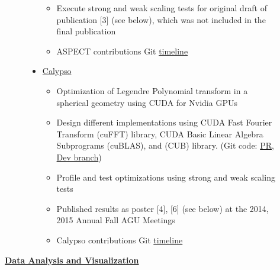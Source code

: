 \documentclass[11pt]{ltxdoc}
\begin{document}
\begin{description}
\begin{description}
\begin{itemize}
\begin{itemize}
            \item Execute strong and weak scaling tests for original draft of publication [3] (see below), which was not included in the final publication              
            
            \item ASPECT contributions Git \href{https://github.com/geodynamics/aspect/commits?author=hlokavarapu}{timeline}

           \end{itemize}

        \item       \href{https://geodynamics.org/cig/software/calypso/}{Calypso}         

          \begin{itemize}
          	
          	\item Optimization of Legendre Polynomial transform in a spherical geometry using CUDA for Nvidia GPUs 
          	
          	\item Design different implementations using CUDA Fast Fourier Transform (cuFFT) library, CUDA Basic Linear Algebra Subprograms (cuBLAS), and (CUB) library. (Git code: \href{https://github.com/geodynamics/calypso/pull/3}{PR}, \href{https://github.com/hlokavarapu/calypso/tree/concurrency/src/Cuda_libraries}{Dev branch})
          	
          	\item Profile and test optimizations using strong and weak scaling tests
          	
          	\item Published results as poster [4], [6] (see below) at the 2014, 2015 Annual Fall AGU Meetings
          	
          	\item Calypso contributions Git \href{https://github.com/geodynamics/calypso/commits/Legendre_transform_w_symmetry}{timeline}
          \end{itemize}
           

      \end{itemize}

    
    \end{description}
    
    \item[] \textbf{\underline{Data Analysis and Visualization}}
    
      \begin{itemize}
      

\end{itemize}
\end{description}
\end{document}
